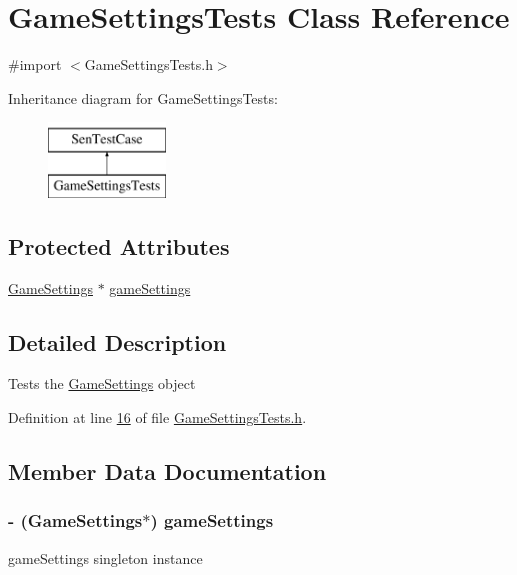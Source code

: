 \hypertarget{interface_game_settings_tests}{\section{Game\-Settings\-Tests Class Reference}
\label{d9/ddc/interface_game_settings_tests}
}


{\ttfamily \#import $<$Game\-Settings\-Tests.\-h$>$}

Inheritance diagram for Game\-Settings\-Tests\-:\begin{figure}[H]
\begin{center}
\leavevmode
\includegraphics[height=2.000000cm]{d9/ddc/interface_game_settings_tests}
\end{center}
\end{figure}
\subsection*{Protected Attributes}
\begin{DoxyCompactItemize}
\item 
\hyperlink{interface_game_settings}{Game\-Settings} $\ast$ \hyperlink{interface_game_settings_tests_abe72ed6a60e61029a7f71293ffef436e}{game\-Settings}
\end{DoxyCompactItemize}


\subsection{Detailed Description}
Tests the \hyperlink{interface_game_settings}{Game\-Settings} object 

Definition at line \hyperlink{_game_settings_tests_8h_source_l00016}{16} of file \hyperlink{_game_settings_tests_8h_source}{Game\-Settings\-Tests.\-h}.



\subsection{Member Data Documentation}
\hypertarget{interface_game_settings_tests_abe72ed6a60e61029a7f71293ffef436e}{
\subsubsection[{game\-Settings}]{\setlength{\rightskip}{0pt plus 5cm}-\/ ({\bf Game\-Settings}$\ast$) game\-Settings\hspace{0.3cm}{\ttfamily [protected]}}}\label{d9/ddc/interface_game_settings_tests_abe72ed6a60e61029a7f71293ffef436e}
game\-Settings singleton instance 

